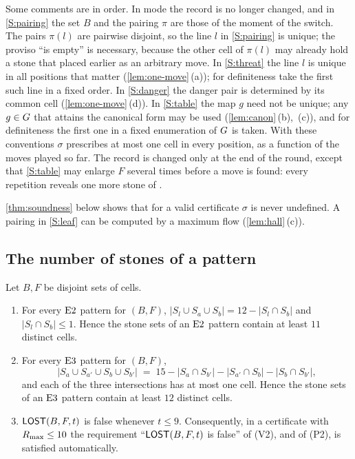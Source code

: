 Some comments are in order. In \PAIRING{} mode the record is no longer changed, and in \ref{S:pairing} the
set $B$ and the pairing $\pi$ are those of the moment of the switch. The pairs $\pi(l)$ are pairwise
disjoint, so the line $l$ in \ref{S:pairing} is unique; the proviso ``is empty'' is necessary, because the
other cell of $\pi(l)$ may already hold a stone that \Breaker{} placed earlier as an arbitrary move. In \ref{S:threat} the line $l$ is unique in all positions that matter
(\cref{lem:one-move}\,(a)); for definiteness take the first such line in a fixed order. In
\ref{S:danger} the danger pair is determined by its common cell (\cref{lem:one-move}\,(d)). In
\ref{S:table} the map $g$ need not be unique; any $g\in G$ that attains the canonical form may be used
(\cref{lem:canon}\,(b),~(c)), and for definiteness the first one in a fixed enumeration of $G$ is taken. With these conventions $\sigma$
prescribes at most one cell in every position, as a function of the moves played so far. The record is
changed only at the end of the round, except that \ref{S:table} may enlarge $F$ several times before a move
is found: every repetition reveals one more stone of \Maker.

\cref{thm:soundness} below shows that for a valid certificate $\sigma$ is never undefined. A pairing in
\ref{S:leaf} can be computed by a maximum flow (\cref{lem:hall}\,(c)).

\subsection{The number of stones of a pattern}\label{sec:stones}

\begin{proposition}\label{prop:lost-stones}
Let $B,F$ be disjoint sets of cells.
\begin{enumerate}[label=\textup{(\alph*)},leftmargin=2.4em]
\item For every $\mathrm{E2}$ pattern for $(B,F)$,
  $|S_l\cup S_a\cup S_b| = 12-|S_l\cap S_b|$ and $|S_l\cap S_b|\le 1$. Hence the stone sets of an
  $\mathrm{E2}$ pattern contain at least $11$ distinct cells.
\item For every $\mathrm{E3}$ pattern for $(B,F)$,
  \[ |S_a\cup S_{a'}\cup S_b\cup S_{b'}| \;=\; 15-|S_a\cap S_{b'}|-|S_{a'}\cap S_b|-|S_b\cap S_{b'}|, \]
  and each of the three intersections has at most one cell. Hence the stone sets of an $\mathrm{E3}$ pattern
  contain at least $12$ distinct cells.
\item $\mathsf{LOST}(B,F,t)$ is false whenever $t\le 9$. Consequently, in a certificate with $R_{\max}\le 10$ the
  requirement ``$\mathsf{LOST}(B,F,t)$ is false'' of \textup{(V2)}, and of \textup{(P2)}, is satisfied automatically.
\end{enumerate}
\end{proposition}

